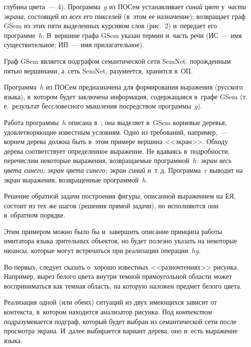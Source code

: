 \begin{multicols}{2}
\vspace*{9pt}

\noindent
 глубина цвета~--- 4). 
Программа~$g$ из ПОСем уста\-нав\-ли\-ва\-ет \textit{синий цвет} 
у~\textit{части экрана}, со\-сто\-ящей из \textit{всех} его пикселей (в~этом ее 
назначение); возвращает граф GSem из этих пяти выделенных кур\-си\-вом 
слов (рис.~2) и~передает его программе~$h$. В~вершине графа GSem указан 
термин и~часть речи (ИС~--- имя существительное; ИП~--- имя прилагательное).


     
  Граф GSem является подграфом семантической сети SemNet, 
по\-рож\-ден\-ным пятью вершинами, а~сеть SemNet, разумеется, хранится 
в~ОП.
  
  Программа~$h$ из ПОСем предназначена для формирования выражения 
(русского языка), в~котором будет заключена информация, со\-дер\-жа\-ща\-яся 
в~графе GSem (т.\,е.\ результат бес\-сло\-вес\-но\-го мыш\-ле\-ния по\-сред\-ст\-вом 
программы~$g$).
  
  Работа программы~$h$ описана в~\cite{5-sh}; она выделяет в~GSem 
корневые деревья, удовле\-тво\-ря\-ющие известным условиям. Одно из 
требований, например,~--- кор\-нем дерева должна быть в~этом примере 
вершина <<экран>>. Обходу дерева соответствует определенное 
выражение. Не вдаваясь в~под\-роб\-но\-сти, пе\-ре\-чис\-лим некоторые 
выражения, воз\-вра\-ща\-емые программой~$h$: \textit{экран весь цвета синего; 
экран цвета синего; экран синий} и~т.\,д. Программа~$r$ выводит на экран 
выражения, воз\-вра\-щен\-ные программой~$h$.
  
  Решение обратной задачи построения фигуры, описанной выражением 
на ЕЯ, со\-сто\-ит из тех же шагов (решения прямой задачи), но исполняются 
они в~обрат\-ном порядке.
  
  Этим примером можно было бы и~завершить описание принципа работы 
имитатора языка зрительных объектов, но будет полезно указать на 
некоторые ню\-ан\-сы, которые могут встречаться при реализации 
операции~$hg$.
  
  Во-первых, следует сказать о~хорошо известных <<разночтениях>> 
рисунка. Например, вырез белого цвета внут\-ри тем\-ной прямоугольной 
об\-ласти может восприниматься как темная об\-ласть, на которую наложен 
пред\-мет белого цвета.
  
  Реализация одной (или обеих) ситуаций из двух име\-ющих\-ся зависит от 
кон\-текс\-та, в~котором находится анализатор рисунка. Под 
\textit{контекстом} под\-разуме\-ва\-ет\-ся подграф, который будет выбран из 
семантической сети после про\-смот\-ра экрана. И~далее выбирается вариант 
дерева, оно и~есть выражение языка.
  

\end{multicols}
